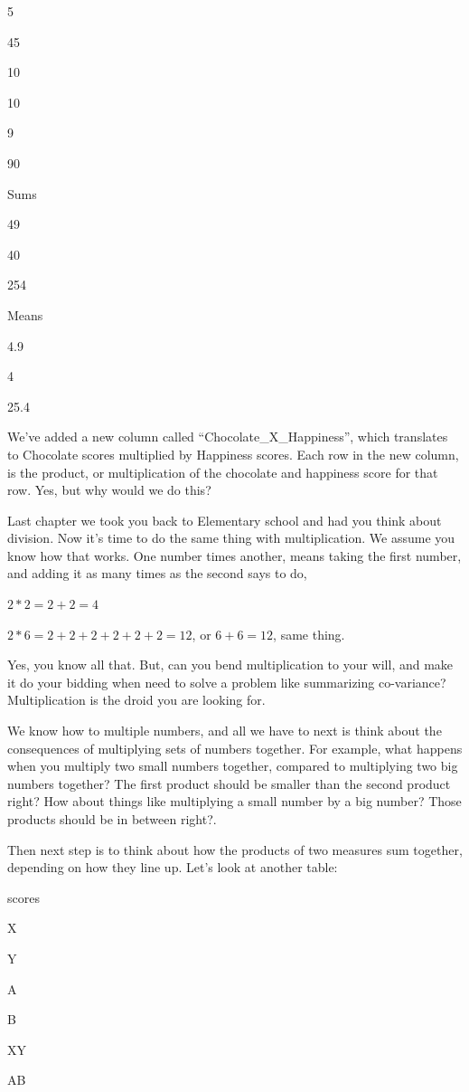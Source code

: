 \documentclass[
]{book}
\begin{document}
5

45

10

10

9

90

Sums

49

40

254

Means

4.9

4

25.4

We've added a new column called ``Chocolate\_X\_Happiness'', which translates to Chocolate scores multiplied by Happiness scores. Each row in the new column, is the product, or multiplication of the chocolate and happiness score for that row. Yes, but why would we do this?

Last chapter we took you back to Elementary school and had you think about division. Now it's time to do the same thing with multiplication. We assume you know how that works. One number times another, means taking the first number, and adding it as many times as the second says to do,

\(2*2= 2+2=4\)

\(2*6= 2+2+2+2+2+2 = 12\), or \(6+6=12\), same thing.

Yes, you know all that. But, can you bend multiplication to your will, and make it do your bidding when need to solve a problem like summarizing co-variance? Multiplication is the droid you are looking for.

We know how to multiple numbers, and all we have to next is think about the consequences of multiplying sets of numbers together. For example, what happens when you multiply two small numbers together, compared to multiplying two big numbers together? The first product should be smaller than the second product right? How about things like multiplying a small number by a big number? Those products should be in between right?.

Then next step is to think about how the products of two measures sum together, depending on how they line up. Let's look at another table:

scores

X

Y

A

B

XY

AB
\end{document}
